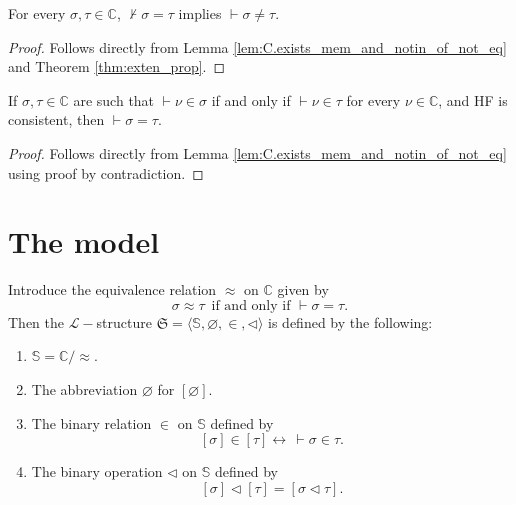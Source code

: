 \begin{corollary}
    \label{cor:C.ne_of_not_eq}
    \leanok
    For every $\sigma, \tau \in \mathbb{C}$, $\not\vdash \sigma = \tau$ implies 
    $\vdash \sigma \neq \tau$.
\end{corollary}

\begin{proof}
    \leanok
    Follows directly from Lemma \ref{lem:C.exists_mem_and_notin_of_not_eq} and 
    Theorem \ref{thm:exten_prop}.
\end{proof}

\begin{corollary}
    \label{cor:C.eq_of_forall_mem_iff_mem}
    \leanok
    If $\sigma, \tau \in \mathbb{C}$ are such that $\vdash \nu \in \sigma$ if and only if
    $\vdash \nu \in \tau$ for every $\nu \in \mathbb{C}$, and HF is consistent, 
    then $\vdash \sigma = \tau$.
\end{corollary}

\begin{proof}
    \leanok
    Follows directly from Lemma \ref{lem:C.exists_mem_and_notin_of_not_eq} 
    using proof by contradiction.
\end{proof}

\section{The model}

\begin{definition}
    \label{def:stdModel}
    \leanok
    Introduce the equivalence relation $\approx$ on $\mathbb{C}$ given by
    $$
    \sigma \approx \tau \,\text{ if and only if } \vdash \sigma = \tau.
    $$
    Then the $\mathcal{L}-$structure 
    $\mathfrak{S} = \langle\mathbb{S}, \varnothing, \in, \lhd \rangle$ is defined by the following:
    \begin{enumerate}
        \item $\mathbb{S} = \mathbb{C}/{\approx}$.
        \item The abbreviation $\varnothing$ for $[\varnothing]$.
        \item The binary relation $\in$ on $\mathbb{S}$ defined by
                $$[\sigma] \in [\tau] \leftrightarrow \,\vdash \sigma \in \tau.$$
        \item The binary operation $\lhd$ on $\mathbb{S}$ defined by
                $$[\sigma] \lhd [\tau] = [\sigma \lhd \tau].$$
    \end{enumerate}
\end{definition}


